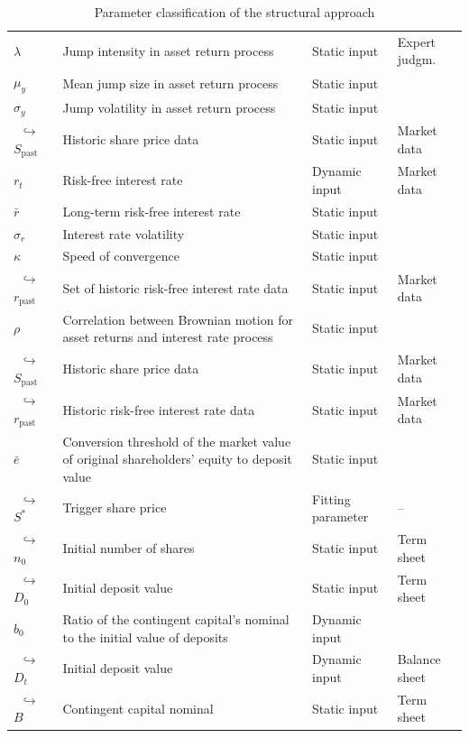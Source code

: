\begin{table}
\begin{tabular}{p{1.8cm}p{6.8cm}p{2.4cm}p{2.5cm}}
			$\lambda$ & Jump intensity in asset return process & Static input  & Expert judgm.  \\	
			$\mu_y$ & Mean jump size in asset return process & Static input &  \\
			$\sigma_y$ & Jump volatility in asset return process & Static input &  \\
			$\,\,\,$$\hookrightarrow$ $S_\text{past}$ &  Historic share price data & Static input & Market data\\
			$r_t$ & Risk-free interest rate & Dynamic input & Market data \\
			$\bar{r}$ & Long-term risk-free interest rate & Static input & \\
			$\sigma_r$ &Interest rate volatility & Static input & \\
			$\kappa$ & Speed of convergence & Static input & \\
			$\,\,\,$$\hookrightarrow$ $r_\text{past}$ & Set of historic risk-free interest rate data & Static input & Market data\\
			$\rho$ & Correlation between Brownian motion for asset returns and interest rate process  & Static input & \\ 
			$\,\,\,$$\hookrightarrow$ $S_\text{past}$ &  Historic share price data & Static input & Market data\\
			$\,\,\,$$\hookrightarrow$ $r_\text{past}$ &  Historic risk-free interest rate data & Static input & Market data\\
			$\bar{e}$ & Conversion threshold of the market value of original shareholders' equity to deposit value & Static input & \\
			$\,\,\,$$\hookrightarrow$ $S^*$ & Trigger share price & Fitting parameter & -- \\
			$\,\,\,$$\hookrightarrow$ $n_0$ & Initial number of shares & Static input & Term sheet\\
			$\,\,\,$$\hookrightarrow$ $D_0$ & Initial deposit value & Static input & Term sheet\\
			$b_0$ & Ratio of the contingent capital's nominal to the initial value of deposits & Dynamic input & \\
			$\,\,\,$$\hookrightarrow$ $D_t$ & Initial deposit value & Dynamic input & Balance sheet \\
			$\,\,\,$$\hookrightarrow$ $B$ & Contingent capital nominal & Static input & Term sheet\\
		\bottomrule
	\end{tabular}
	\caption[Parameter classification of the structural approach]{Parameter classification of the structural approach}
	\label{tbl:structuralapproachdata}
\end{table}

